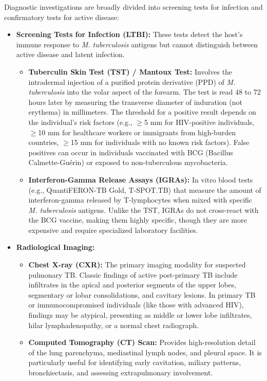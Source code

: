 Diagnostic investigations are broadly divided into screening tests for infection and confirmatory tests for active disease:

\begin{itemize}
    \item \textbf{Screening Tests for Infection (LTBI):} These tests detect the host's immune response to \textit{M. tuberculosis} antigens but cannot distinguish between active disease and latent infection.
    \begin{itemize}
        \item \textbf{Tuberculin Skin Test (TST) / Mantoux Test:} Involves the intradermal injection of a purified protein derivative (PPD) of \textit{M. tuberculosis} into the volar aspect of the forearm. The test is read 48 to 72 hours later by measuring the transverse diameter of induration (not erythema) in millimeters. The threshold for a positive result depends on the individual's risk factors (e.g., $\ge$5 mm for HIV-positive individuals, $\ge$10 mm for healthcare workers or immigrants from high-burden countries, $\ge$15 mm for individuals with no known risk factors). False positives can occur in individuals vaccinated with BCG (Bacillus Calmette-Gu\'{e}rin) or exposed to non-tuberculous mycobacteria.
        \item \textbf{Interferon-Gamma Release Assays (IGRAs):} In vitro blood tests (e.g., QuantiFERON-TB Gold, T-SPOT.TB) that measure the amount of interferon-gamma released by T-lymphocytes when mixed with specific \textit{M. tuberculosis} antigens. Unlike the TST, IGRAs do not cross-react with the BCG vaccine, making them highly specific, though they are more expensive and require specialized laboratory facilities.
    \end{itemize}
    \item \textbf{Radiological Imaging:}
    \begin{itemize}
        \item \textbf{Chest X-ray (CXR):} The primary imaging modality for suspected pulmonary TB. Classic findings of active post-primary TB include infiltrates in the apical and posterior segments of the upper lobes, segmentary or lobar consolidations, and cavitary lesions. In primary TB or immunocompromised individuals (like those with advanced HIV), findings may be atypical, presenting as middle or lower lobe infiltrates, hilar lymphadenopathy, or a normal chest radiograph.
        \item \textbf{Computed Tomography (CT) Scan:} Provides high-resolution detail of the lung parenchyma, mediastinal lymph nodes, and pleural space. It is particularly useful for identifying early cavitation, miliary patterns, bronchiectasis, and assessing extrapulmonary involvement.

\end{itemize}
\end{itemize}
